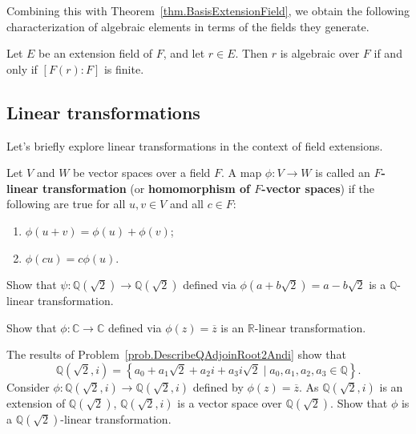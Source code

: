 Combining this with Theorem~\ref{thm.BasisExtensionField}, we obtain the following characterization of algebraic elements in terms of the fields they generate.

\begin{corollary}
Let $E$ be an extension field of $F$, and let $r\in E$. Then $r$ is algebraic over $F$ if and only if $[F(r):F]$ is finite.
\end{corollary}

\subsection{Linear transformations}
Let's briefly explore linear transformations in the context of field extensions.

\begin{definition}
Let $V$ and $W$ be vector spaces over a field $F$. A map $\phi:V\to W$ is called an \textbf{$F$-linear transformation} (or \textbf{homomorphism of $F$-vector spaces}) if the following are true for all $u,v\in V$ and all $c\in F$:
\begin{enumerate}
\item $\phi(u+v)=\phi(u)+\phi(v)$;
\item $\phi(cu)=c\phi(u)$.
\end{enumerate}
\end{definition}

\begin{problem}
Show that $\psi:\mathbb{Q}(\sqrt{2})\rightarrow\mathbb{Q}(\sqrt{2})$ defined via $\phi(a+b\sqrt{2}) = a-b\sqrt{2}$ is a $\mathbb{Q}$-linear transformation.
\end{problem}

\begin{problem}
Show that $\phi:\mathbb{C}\rightarrow\mathbb{C}$ defined via $\phi(z) = \overline{z}$ is an $\mathbb{R}$-linear transformation.
\end{problem}

\begin{problem}
The results of Problem~\ref{prob.DescribeQAdjoinRoot2Andi} show that 
\[\mathbb{Q}(\sqrt{2},i) = \left\{a_0+a_1\sqrt{2} + a_2i + a_3i\sqrt{2}\mid a_0,a_1,a_2,a_3\in \mathbb{Q}\right\}.\]
Consider $\phi:\mathbb{Q}(\sqrt{2},i)\rightarrow\mathbb{Q}(\sqrt{2},i)$ defined by $\phi(z) = \overline{z}$. 
As $\mathbb{Q}(\sqrt{2},i)$ is an extension of $\mathbb{Q}(\sqrt{2})$, $\mathbb{Q}(\sqrt{2},i)$ is a vector space over $\mathbb{Q}(\sqrt{2})$. Show that $\phi$ is a $\mathbb{Q}(\sqrt{2})$-linear transformation.
\end{problem}







